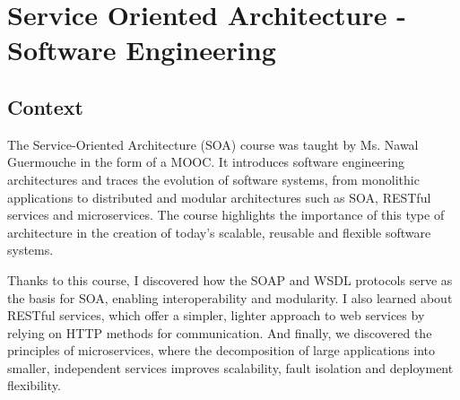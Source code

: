\section{Service Oriented Architecture - Software Engineering}
\label{sec:service_architecture}
\subsection{Context}

\indent \indent The Service-Oriented Architecture (SOA) course was taught by Ms. Nawal Guermouche in the form of a MOOC.
It introduces software engineering architectures and traces the evolution of software systems, from monolithic applications to distributed and modular architectures such as SOA, RESTful services and microservices.
The course highlights the importance of this type of architecture in the creation of today's scalable, reusable and flexible software systems.
\vspace{0.25cm}

\noindent Thanks to this course, I discovered how the SOAP and WSDL protocols serve as the basis for SOA, enabling interoperability and modularity.
I also learned about RESTful services, which offer a simpler, lighter approach to web services by relying on HTTP methods for communication. 
And finally, we discovered the principles of microservices, where the decomposition of large applications into smaller, independent services improves scalability, fault isolation and deployment flexibility.
\vspace{0.25cm}


